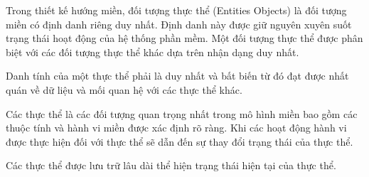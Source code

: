 Trong  thiết kế hướng miền, đối tượng thực thể (Entities Objects)  là        đối tượng miền   có định danh riêng duy nhất. Định danh này được giữ nguyên xuyên suốt trạng thái hoạt động của hệ thống phần mềm. Một đối tượng       thực thể     được phân biệt với các đối tượng thực thể  khác dựa trên nhận dạng duy nhất.

Danh tính của một thực thể phải là duy nhất và bất biến từ đó đạt được nhất quán về dữ liệu    và mối quan hệ với các thực thể   khác.


Các thực thể   là các đối tượng quan trọng nhất trong mô hình miền     bao gồm các thuộc tính và hành vi miền được xác định rõ ràng.  Khi các hoạt động  hành vi được thực hiện đối với thực thể sẽ dẫn đến sự thay đổi trạng thái của thực thể.

Các thực thể được lưu trữ lâu dài thể hiện trạng thái hiện tại của thực thể. 



